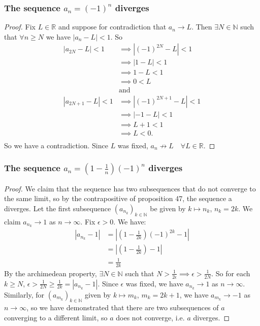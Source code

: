 \documentclass{article}
\begin{document}
\subsubsection{The sequence $a_n = (-1)^n$ diverges}
\begin{proof}
Fix $L \in \mathbb{R}$ and suppose for contradiction that $a_n \to L$. Then
 $\exists N \in \mathbb{N}$ such that $\forall n \geq N$ we have $|a_n-L|<1$. So
\begin{align*}
\left |  a_{2N}-L \right |<1 &\implies \left |(-1)^{2N}-L \right |<1 \\
&\implies \left |1-L \right | <1\\
&\implies 1-L<1 \\
&\implies 0<L \\
&\text{and} \\
\left |  a_{2N+1}-L \right |<1 &\implies \left |(-1)^{2N+1}-L \right |<1 \\
&\implies \left |-1-L \right | <1\\
&\implies L+1<1 \\
&\implies L<0. \\
\end{align*}
So we have a contradiction. Since $L$ was fixed, $a_n \not \to L \quad \forall L \in \mathbb{R}$.
\end{proof}
\subsubsection{The sequence $a_n = (1-\frac{1}{n})(-1)^n$ diverges}
\begin{proof}
We claim that the sequence has two subsequences that do not converge to the same limit, so by the
contrapositive of proposition 47, the sequence a diverges. Let the first subsequence $(a_{n_k})_{k \in \mathbb{N}}$
be given by $k \mapsto n_k$, $n_k = 2k$. We claim $a_{n_k} \to 1$ as $n \to \infty$. Fix $\epsilon>0$. We have:
\begin{align*}
\left |  a_{n_k}-1 \right | &= \left |(1-\frac{1}{2k})(-1)^{2k}-1 \right | \\
&= \left |(1-\frac{1}{2k})-1 \right | \\
&= \frac{1}{2k}
\end{align*}
By the archimedean property, $\exists N \in \mathbb{N}$ such that $N>\frac{1}{2\epsilon}
\implies \epsilon > \frac{1}{2N}$. So for each $k\geq N$, $\epsilon>\frac{1}{2N}\geq\frac{1}{2k}=|a_{n_k}-1|$.
Since $\epsilon$ was fixed, we have $a_{n_k} \to 1$ as $n \to \infty$. Similarly,
for $(a_{m_k})_{k \in \mathbb{N}}$ given by $k \mapsto m_k$, $m_k = 2k+1$, we have
$a_{m_k} \to -1$ as $n \to \infty$, so we have demonstrated that
there are two subsequences of $a$ converging to a
different limit, so $a$ does not converge, i.e. $a$ diverges.
\end{proof}
\end{document}
